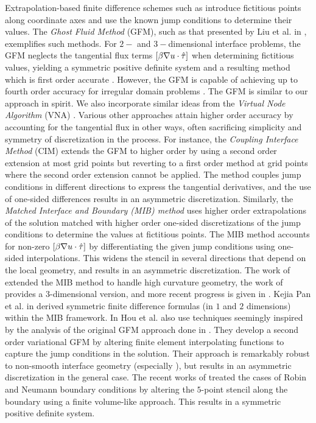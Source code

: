 Extrapolation-based finite difference schemes such as \cite{Liu.Xu-Dong00, Gibou02, Zhou.YC06a, Gibou05, Jomaa05, Chern07} introduce fictitious points along coordinate axes and use the known jump conditions to determine their values. The \emph{Ghost Fluid Method} (GFM), such as that presented by Liu et al. in \cite{Liu.Xu-Dong00}, exemplifies such methods. For $2-$ and $3-$dimensional interface problems, the GFM neglects the tangential flux terms $\left[ \beta \nabla u \cdot \hat{\mathbf{\tau}} \right]$ when determining fictitious values, yielding a symmetric positive definite system and a resulting method which is first order accurate \cite{Liu.Xu-Dong00, Liu.Xu-Dong03}. However, the GFM is capable of achieving up to fourth order accuracy for irregular domain problems \cite{Gibou02, Gibou05}. The GFM is similar to our approach in spirit. We also incorporate similar ideas from the \emph{Virtual Node Algorithm} (VNA) \cite{Molino05, Bao.Zhaosheng07, Sifakis07}. Various other approaches attain higher order accuracy by accounting for the tangential flux in other ways, often sacrificing simplicity and symmetry of discretization in the process. For instance, the \emph{Coupling Interface Method} (CIM) \cite{Chern07} extends the GFM to higher order by using a second order extension at most grid points but reverting to a first order method at grid points where the second order extension cannot be applied. The method couples jump conditions in different directions to express the tangential derivatives, and the use of one-sided differences results in an asymmetric discretization. Similarly, the \emph{Matched Interface and Boundary \textnormal{(MIB)} method} \cite{Zhou.YC06a} uses higher order extrapolations of the solution matched with higher order one-sided discretizations of the jump conditions to determine the values at fictitious points. The MIB method accounts for non-zero $\left[ \beta \nabla u \cdot \hat{\mathbf{\tau}} \right]$ by differentiating the given jump conditions using one-sided interpolations. This widens the stencil in several directions that depend on the local geometry, and results in an asymmetric discretization. The work of \cite{Zhou.YC06b} extended the MIB method to handle high curvature geometry, the work of \cite{Yu.Sining07} provides a $3$-dimensional version, and more recent progress is given in \cite{Zhao.Shan09}. Kejia Pan et al. in \cite{Pan.Kejia10} derived symmetric finite difference formulas (in $1$ and $2$ dimensions) within the MIB framework. In \cite{Hou.Songming05,Hou.Songming10} Hou et al. also use techniques seemingly inspired by the analysis of the original GFM approach done in \cite{Liu.Xu-Dong00,Liu.Xu-Dong03}. They develop a second order variational GFM by altering finite element interpolating functions to capture the jump conditions in the solution. Their approach is remarkably robust to non-smooth interface geometry (especially \cite{Hou.Songming10}), but results in an asymmetric discretization in the general case. The recent works of \cite{Ng.YenTing09, Papac10} treated the cases of Robin and Neumann boundary conditions by altering the $5$-point stencil along the boundary using a finite volume-like approach. This results in a symmetric positive definite system.

